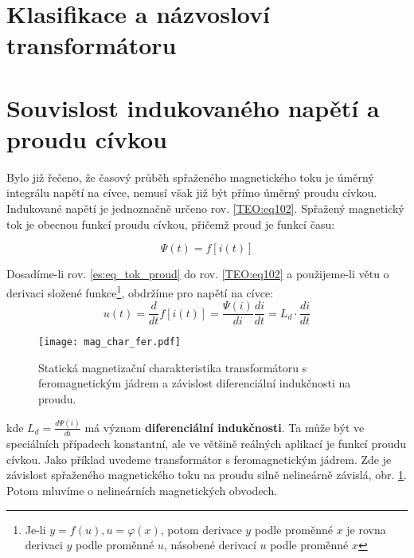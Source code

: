   \section{Klasifikace a názvosloví transformátoru}

  \section{Souvislost indukovaného napětí a proudu cívkou}
    Bylo již řečeno, že časový průběh spřaženého magnetického toku je úměrný integrálu napětí na 
    cívce, nemusí však již být přímo úměrný proudu cívkou. Indukované napětí je jednoznačně určeno 
    rov. \ref{TEO:eq102}. Spřažený magnetický tok je obecnou funkcí proudu cívkou, přičemž 
    proud je
    funkcí času:
    
    \begin{equation}\label{es:eq_tok_proud}
      \Psi(t) = f[i(t)]
    \end{equation}           

    Dosadíme-li rov. \ref{es:eq_tok_proud} do rov. \ref{TEO:eq102} a použijeme-li větu o 
    derivaci složené funkce\footnote{Je-li $y = f(u), u = \varphi(x)$, potom derivace $y$ podle 
    proměnné $x$ je rovna derivaci $y$ podle proměnné $u$, násobené derivací $u$ podle proměnné 
    $x$}, obdržíme pro napětí na cívce:
    \begin{equation}\label{es_tok_deriv}
      u(t) = \frac{d}{dt} f[i(t)] = \frac{\Psi(i)}{di} \frac{di}{dt} = L_d \cdot \frac{di}{dt}
    \end{equation}

    \begin{figure}[ht!]  %
      \centering
      \texttt{[image: mag\_char\_fer.pdf]}
      \caption{Statická magnetizační charakteristika transformátoru s feromagnetickým jádrem a 
        závislost diferenciální indukčnosti na proudu. \cite[s.~5]{Elrev2005trafo}}
      \label{es:fig_mag_char_trafa_fer}
    \end{figure}
    
    kde $L_d=\frac{d\Psi(i)}{di}$ má význam \textbf{diferenciální indukčnosti}. Ta může být ve 
    speciálních případech konstantní, ale ve většině reálných aplikací je funkcí proudu cívkou. 
    Jako příklad uvedeme transformátor s feromagnetickým jádrem. Zde je závislost spřaženého 
    magnetického toku na proudu silně nelineárně závislá, obr. \ref{es:fig_mag_char_trafa_fer}. 
    Potom mluvíme o nelineárních magnetických obvodech.

